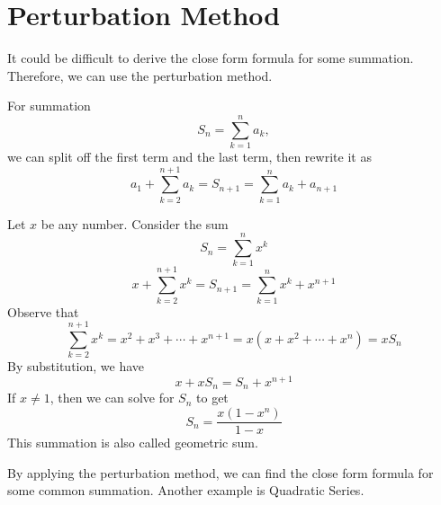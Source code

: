 \section{Perturbation Method}
It could be difficult to derive the close form formula for some summation. Therefore, we can use the perturbation method.

For summation
\[
S_n = \sum_{k = 1}^n a_k,
\]
we can split off the first term and the last term, then rewrite it as
\[
	a_1 + \sum_{k = 2}^{n + 1} a_k = S_{n+1} = \sum_{k = 1}^{n} a_k + a_{n + 1}
\]

\begin{eg}
	Let \(x\)  be any number. Consider the sum
	\[
		S_n = \sum_{k = 1}^n x^k
	\]
	\[
		x + \sum_{k = 2}^{n + 1} x^k = S_{n+1} = \sum_{k = 1}^{n} x^k + x^{n+1}
	\]
	Observe that
	\[
	\sum_{k = 2}^{n + 1} x^k = x^2 + x^3 + \cdots + x^{n+1} = x(x + x^2 + \cdots + x^n) = xS_n
	\]
	By substitution, we have
\[
	x+ xS_n = S_n + x^{n+1}
\]
If \(x \neq 1\), then we can solve for \(S_n\) to get
\[
	S_n = \dfrac{x(1 - x^n)}{1 - x}
\] 
This summation is also called geometric sum.
\end{eg}

By applying the perturbation method, we can find the close form formula for some common summation. Another example is Quadratic Series.

